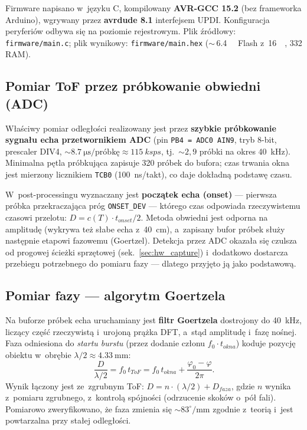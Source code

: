 \documentclass[a4paper,11pt]{article}
\begin{document}
Firmware napisano w~języku C, kompilowany \textbf{AVR-GCC 15.2} (bez frameworka
Arduino), wgrywany przez \textbf{avrdude 8.1} interfejsem UPDI. Konfiguracja
peryferiów odbywa się na poziomie rejestrowym. Plik źródłowy:
\texttt{firmware/main.c}; plik wynikowy: \texttt{firmware/main.hex}
(${\sim}$\,\SI{6,4}{\kilo\byte} Flash z~\SI{16}{\kilo\byte}, \SI{332}{\byte} RAM).

\subsection{Pomiar ToF przez próbkowanie obwiedni (ADC)}
\label{sec:adc}

Właściwy pomiar odległości realizowany jest przez \textbf{szybkie próbkowanie
sygnału echa przetwornikiem ADC} (pin \texttt{PB4 = ADC0 AIN9}, tryb 8-bit,
prescaler DIV4, ${\sim}\SI{8,7}{\micro\second}/\text{próbkę} \approx
\SI{115}{ksps}$, tj.\ ${\sim}2{,}9$ próbki na okres \SI{40}{\kilo\hertz}).
Minimalna pętla próbkująca zapisuje \SI{320}{} próbek do bufora; czas trwania
okna jest mierzony licznikiem \texttt{TCB0} (\SI{100}{\nano\second}/takt), co
daje dokładną podstawę czasu.

W~post-processingu wyznaczany jest \textbf{początek echa (onset)} --- pierwsza
próbka przekraczająca próg \texttt{ONSET\_DEV} --- którego czas odpowiada
rzeczywistemu czasowi przelotu: $D = c(T)\cdot t_{onset}/2$. Metoda obwiedni
jest odporna na amplitudę (wykrywa też słabe echa z~\SI{40}{\centi\metre}),
a~zapisany bufor próbek służy następnie etapowi fazowemu (Goertzel).
Detekcja przez ADC okazała się czulsza od progowej ścieżki sprzętowej
(sek.~\ref{sec:hw_capture}) i~dodatkowo dostarcza przebiegu potrzebnego do
pomiaru fazy --- dlatego przyjęto ją jako podstawową.

\subsection{Pomiar fazy --- algorytm Goertzela}
\label{sec:goertzel}

Na buforze próbek echa uruchamiany jest \textbf{filtr Goertzela} dostrojony do
\SI{40}{\kilo\hertz}, liczący część rzeczywistą i~urojoną prążka DFT, a~stąd
amplitudę i~fazę nośnej. Faza odniesiona do \emph{startu burstu} (przez
dodanie członu $f_0\cdot t_{okna}$) koduje pozycję obiektu w~obrębie
$\lambda/2 \approx \SI{4,33}{\milli\metre}$:
\begin{equation}
	\frac{D}{\lambda/2} = f_0\,t_{ToF}
	= f_0\,t_{okna} + \frac{\varphi_0 - \varphi}{2\pi}.
\end{equation}
Wynik łączony jest ze~zgrubnym ToF: $D = n\cdot(\lambda/2) + D_{faza}$, gdzie
$n$ wynika z~pomiaru zgrubnego, z~kontrolą spójności (odrzucenie skoków o~pół
fali). Pomiarowo zweryfikowano, że faza zmienia się ${\sim}83^\circ/\si{\milli\metre}$
zgodnie z~teorią i~jest powtarzalna przy stałej odległości.
\end{document}
